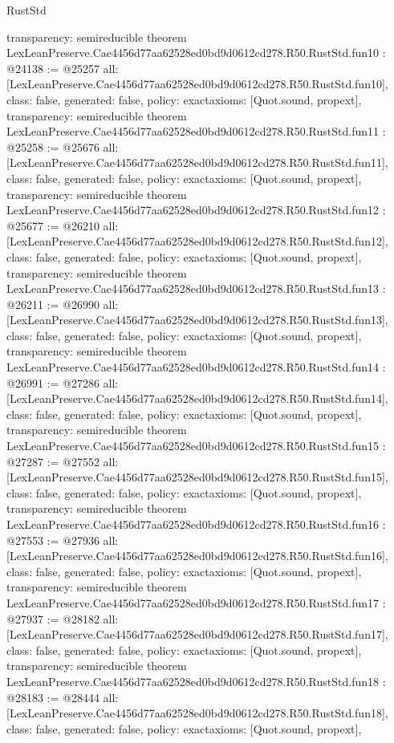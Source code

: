 \begin{lexlean}{RustStd}
\begin{coremodule}
{  transparency: semireducible
}
theorem LexLeanPreserve.Cae4456d77aa62528ed0bd9d0612cd278.R50.RustStd.fun10 : @24138 := @25257 {
  all: [LexLeanPreserve.Cae4456d77aa62528ed0bd9d0612cd278.R50.RustStd.fun10],
  class: false,
  generated: false,
  policy: exact{axioms: [Quot.sound, propext]},
  transparency: semireducible
}
theorem LexLeanPreserve.Cae4456d77aa62528ed0bd9d0612cd278.R50.RustStd.fun11 : @25258 := @25676 {
  all: [LexLeanPreserve.Cae4456d77aa62528ed0bd9d0612cd278.R50.RustStd.fun11],
  class: false,
  generated: false,
  policy: exact{axioms: [Quot.sound, propext]},
  transparency: semireducible
}
theorem LexLeanPreserve.Cae4456d77aa62528ed0bd9d0612cd278.R50.RustStd.fun12 : @25677 := @26210 {
  all: [LexLeanPreserve.Cae4456d77aa62528ed0bd9d0612cd278.R50.RustStd.fun12],
  class: false,
  generated: false,
  policy: exact{axioms: [Quot.sound, propext]},
  transparency: semireducible
}
theorem LexLeanPreserve.Cae4456d77aa62528ed0bd9d0612cd278.R50.RustStd.fun13 : @26211 := @26990 {
  all: [LexLeanPreserve.Cae4456d77aa62528ed0bd9d0612cd278.R50.RustStd.fun13],
  class: false,
  generated: false,
  policy: exact{axioms: [Quot.sound, propext]},
  transparency: semireducible
}
theorem LexLeanPreserve.Cae4456d77aa62528ed0bd9d0612cd278.R50.RustStd.fun14 : @26991 := @27286 {
  all: [LexLeanPreserve.Cae4456d77aa62528ed0bd9d0612cd278.R50.RustStd.fun14],
  class: false,
  generated: false,
  policy: exact{axioms: [Quot.sound, propext]},
  transparency: semireducible
}
theorem LexLeanPreserve.Cae4456d77aa62528ed0bd9d0612cd278.R50.RustStd.fun15 : @27287 := @27552 {
  all: [LexLeanPreserve.Cae4456d77aa62528ed0bd9d0612cd278.R50.RustStd.fun15],
  class: false,
  generated: false,
  policy: exact{axioms: [Quot.sound, propext]},
  transparency: semireducible
}
theorem LexLeanPreserve.Cae4456d77aa62528ed0bd9d0612cd278.R50.RustStd.fun16 : @27553 := @27936 {
  all: [LexLeanPreserve.Cae4456d77aa62528ed0bd9d0612cd278.R50.RustStd.fun16],
  class: false,
  generated: false,
  policy: exact{axioms: [Quot.sound, propext]},
  transparency: semireducible
}
theorem LexLeanPreserve.Cae4456d77aa62528ed0bd9d0612cd278.R50.RustStd.fun17 : @27937 := @28182 {
  all: [LexLeanPreserve.Cae4456d77aa62528ed0bd9d0612cd278.R50.RustStd.fun17],
  class: false,
  generated: false,
  policy: exact{axioms: [Quot.sound, propext]},
  transparency: semireducible
}
theorem LexLeanPreserve.Cae4456d77aa62528ed0bd9d0612cd278.R50.RustStd.fun18 : @28183 := @28444 {
  all: [LexLeanPreserve.Cae4456d77aa62528ed0bd9d0612cd278.R50.RustStd.fun18],
  class: false,
  generated: false,
  policy: exact{axioms: [Quot.sound, propext]},
}
\end{coremodule}
\end{lexlean}
